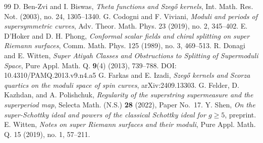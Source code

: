 \documentclass[10pt,a4paper]{amsart}
\begin{document}
\begin{thebibliography}{99}
 D. Ben-Zvi and I. Biswas, \emph{Theta functions and Szeg\H{o} kernels}, Int. Math. Res. Not. (2003), no. 24, 1305--1340.
 G. Codogni and F. Viviani, \emph{Moduli and periods of supersymmetric curves}, Adv. Theor. Math. Phys. 23 (2019), no. 2, 345--402.
 E. D’Hoker and D. H. Phong, \emph{Conformal scalar fields and chiral splitting on super Riemann surfaces}, Comm. Math. Phys. 125 (1989), no. 3, 469--513.
 R. Donagi and E. Witten, \emph{Super Atiyah Classes and Obstructions to Splitting of Supermoduli Space}, Pure Appl. Math. Q. \textbf{9}(4) (2013), 739--788. DOI: 10.4310/PAMQ.2013.v9.n4.a5
 G. Farkas and E. Izadi, \emph{Szeg\H{o} kernels and Scorza quartics on the moduli space of spin curves}, arXiv:2409.13303.
 G. Felder, D. Kazhdan, and A. Polishchuk, \emph{Regularity of the superstring supermeasure and the superperiod map}, Selecta Math. (N.S.) \textbf{28} (2022), Paper No.~17.
 Y. Shen, \emph{On the super-Schottky ideal and powers of the classical Schottky ideal for $g\ge 5$}, preprint.
 E. Witten, \emph{Notes on super Riemann surfaces and their moduli}, Pure Appl. Math. Q. 15 (2019), no. 1, 57--211.
\end{thebibliography}
\end{document}
